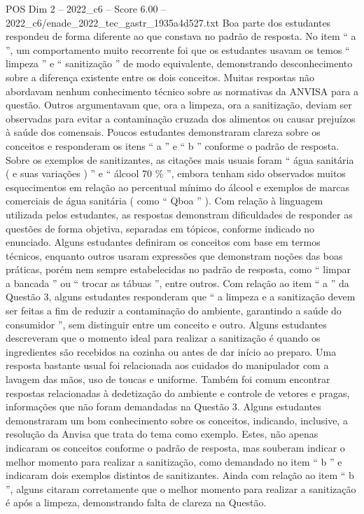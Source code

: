 \begin{textsample}{POS Dim 2 – 2022\_c6 – Score 6.00 – 2022\_c6/enade\_2022\_tec\_gastr\_1935a4d527.txt}
Boa parte dos estudantes respondeu de forma diferente ao que constava no padrão de resposta.
No item “ a ”, um comportamento muito recorrente foi que os estudantes usavam os temos “ limpeza ” e “ sanitização ” de modo equivalente, demonstrando desconhecimento sobre a diferença existente entre os dois conceitos.
Muitas respostas não abordavam nenhum conhecimento técnico sobre as normativas da ANVISA para a questão.
Outros argumentavam que, ora a limpeza, ora a sanitização, deviam ser observadas para evitar a contaminação cruzada dos alimentos ou causar prejuízos à saúde dos comensais.
Poucos estudantes demonstraram clareza sobre os conceitos e responderam os itens “ a ” e “ b ” conforme o padrão de resposta.
Sobre os exemplos de sanitizantes, as citações mais usuais foram “ água sanitária ( e suas variações ) ” e “ álcool 70 \% ”, embora tenham sido observados muitos esquecimentos em relação ao percentual mínimo do álcool e exemplos de marcas comerciais de água sanitária ( como “ Qboa ” ).
Com relação à linguagem utilizada pelos estudantes, as respostas demonstram dificuldades de responder as questões de forma objetiva, separadas em tópicos, conforme indicado no enunciado.
Alguns estudantes definiram os conceitos com base em termos técnicos, enquanto outros usaram expressões que demonstram noções das boas práticas, porém nem sempre estabelecidas no padrão de resposta, como “ limpar a bancada ” ou “ trocar as tábuas ”, entre outros.
Com relação ao item “ a ” da Questão 3, alguns estudantes responderam que “ a limpeza e a sanitização devem ser feitas a fim de reduzir a contaminação do ambiente, garantindo a saúde do consumidor ”, sem distinguir entre um conceito e outro.
Alguns estudantes descreveram que o momento ideal para realizar a sanitização é quando os ingredientes são recebidos na cozinha ou antes de dar início ao preparo.
Uma resposta bastante usual foi relacionada aos cuidados do manipulador com a lavagem das mãos, uso de toucas e uniforme.
Também foi comum encontrar respostas relacionadas à dedetização do ambiente e controle de vetores e pragas, informações que não foram demandadas na Questão 3.
Alguns estudantes demonstraram um bom conhecimento sobre os conceitos, indicando, inclusive, a resolução da Anvisa que trata do tema como exemplo.
Estes, não apenas indicaram os conceitos conforme o padrão de resposta, mas souberam indicar o melhor momento para realizar a sanitização, como demandado no item “ b ” e indicaram dois exemplos distintos de sanitizantes.
Ainda com relação ao item “ b ”, alguns citaram corretamente que o melhor momento para realizar a sanitização é após a limpeza, demonstrando falta de clareza na Questão.

\end{textsample}
